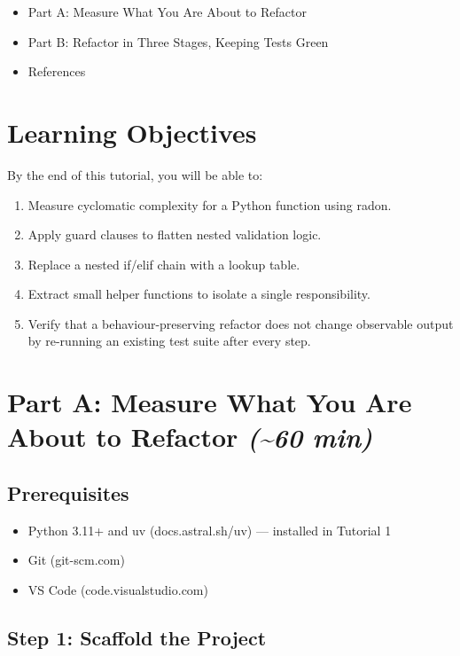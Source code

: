 \documentclass[11pt,a4paper]{book}
\begin{document}
\begin{itemize}
  \item Part A: Measure What You Are About to Refactor
  \item Part B: Refactor in Three Stages, Keeping Tests Green
  \item References
\end{itemize}

\medskip

\section{Learning Objectives}

By the end of this tutorial, you will be able to:

\begin{enumerate}
  \item Measure cyclomatic complexity for a Python function using radon.
  \item Apply guard clauses to flatten nested validation logic.
  \item Replace a nested if/elif chain with a lookup table.
  \item Extract small helper functions to isolate a single responsibility.
  \item Verify that a behaviour-preserving refactor does not change observable output by re-running an existing test suite after every step.
\end{enumerate}

\medskip

\section{Part A: Measure What You Are About to Refactor \textit{(\textasciitilde{}60 min)}}

\subsection{Prerequisites}

\begin{itemize}
  \item Python 3.11+ and uv (docs.astral.sh/uv) --- installed in Tutorial 1
  \item Git (git-scm.com)
  \item VS Code (code.visualstudio.com)
\end{itemize}

\medskip

\subsection{Step 1: Scaffold the Project}
\end{document}

